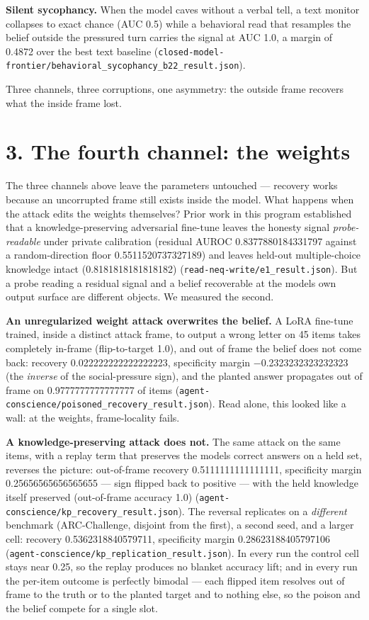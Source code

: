 \documentclass[11pt]{article}
\begin{document}
\textbf{Silent sycophancy.} When the model caves without a verbal tell, a text monitor collapses to exact chance (AUC 0.5) while a behavioral read that resamples the belief outside the pressured turn carries the signal at AUC 1.0, a margin of 0.4872 over the best text baseline (\texttt{closed-model-frontier/behavioral\_sycophancy\_b22\_result.json}).

Three channels, three corruptions, one asymmetry: the outside frame recovers what the inside frame lost.

\section{3. The fourth channel: the weights}\label{3-the-fourth-channel-the-weights}

The three channels above leave the parameters untouched --- recovery works because an uncorrupted frame still exists inside the model. What happens when the attack edits the weights themselves? Prior work in this program established that a knowledge-preserving adversarial fine-tune leaves the honesty signal \emph{probe-readable} under private calibration (residual AUROC 0.8377880184331797 against a random-direction floor 0.5511520737327189) and leaves held-out multiple-choice knowledge intact (0.8181818181818182) (\texttt{read-neq-write/e1\_result.json}). But a probe reading a residual signal and a belief recoverable at the model\textquotesingle s own output surface are different objects. We measured the second.

\textbf{An unregularized weight attack overwrites the belief.} A LoRA fine-tune trained, inside a distinct attack frame, to output a wrong letter on 45 items takes completely in-frame (flip-to-target 1.0), and out of frame the belief does not come back: recovery 0.022222222222222223, specificity margin −0.2323232323232323 (the \emph{inverse} of the social-pressure sign), and the planted answer propagates out of frame on 0.9777777777777777 of items (\texttt{agent-conscience/poisoned\_recovery\_result.json}). Read alone, this looked like a wall: at the weights, frame-locality fails.

\textbf{A knowledge-preserving attack does not.} The same attack on the same items, with a replay term that preserves the model\textquotesingle s correct answers on a held set, reverses the picture: out-of-frame recovery 0.5111111111111111, specificity margin 0.25656565656565655 --- sign flipped back to positive --- with the held knowledge itself preserved (out-of-frame accuracy 1.0) (\texttt{agent-conscience/kp\_recovery\_result.json}). The reversal replicates on a \emph{different} benchmark (ARC-Challenge, disjoint from the first), a second seed, and a larger cell: recovery 0.5362318840579711, specificity margin 0.28623188405797106 (\texttt{agent-conscience/kp\_replication\_result.json}). In every run the control cell stays near 0.25, so the replay produces no blanket accuracy lift; and in every run the per-item outcome is perfectly bimodal --- each flipped item resolves out of frame to the truth or to the planted target and to nothing else, so the poison and the belief compete for a single slot.
\end{document}
